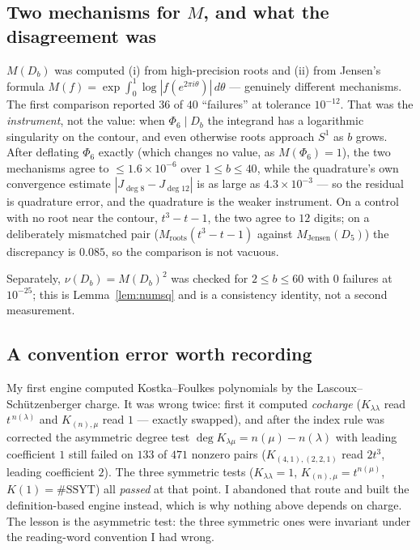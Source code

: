 \documentclass[11pt]{article}
\theoremstyle{definition}
\newcommand{\lam}{\lambda}
\newcommand{\Scirc}{S^1}
\begin{document}
\subsection{Two mechanisms for $M$, and what the disagreement was}

$M(D_b)$ was computed (i) from high-precision roots and (ii) from Jensen's formula
$M(f)=\exp\int_0^1\log|f(e^{2\pi i\theta})|\,d\theta$ --- genuinely different mechanisms. The
first comparison reported $36$ of $40$ ``failures'' at tolerance $10^{-12}$. That was the
\emph{instrument}, not the value: when $\Phi_6\mid D_b$ the integrand has a logarithmic
singularity on the contour, and even otherwise roots approach $\Scirc$ as $b$ grows. After
deflating $\Phi_6$ exactly (which changes no value, as $M(\Phi_6)=1$), the two mechanisms agree to
$\le1.6\times10^{-6}$ over $1\le b\le40$, while the quadrature's own convergence estimate
$|J_{\deg 8}-J_{\deg 12}|$ is as large as $4.3\times10^{-3}$ --- so the residual is quadrature
error, and the quadrature is the weaker instrument. On a control with no root near the contour,
$t^{3}-t-1$, the two agree to $12$ digits; on a deliberately mismatched pair
($M_{\text{roots}}(t^3-t-1)$ against $M_{\text{Jensen}}(D_5)$) the discrepancy is $0.085$, so the
comparison is not vacuous.

Separately, $\nu(D_b)=M(D_b)^{2}$ was checked for $2\le b\le60$ with $0$ failures at $10^{-25}$;
this is Lemma~\ref{lem:numsq} and is a consistency identity, not a second measurement.

\subsection{A convention error worth recording}

My first engine computed Kostka--Foulkes polynomials by the Lascoux--Schützenberger charge. It was
wrong twice: first it computed \emph{cocharge} ($K_{\lam\lam}$ read $t^{\,n(\lam)}$ and
$K_{(n),\mu}$ read $1$ --- exactly swapped), and after the index rule was corrected the asymmetric
degree test $\deg K_{\lam\mu}=n(\mu)-n(\lam)$ with leading coefficient $1$ still failed on $133$
of $471$ nonzero pairs ($K_{(4,1),(2,2,1)}$ read $2t^{3}$, leading coefficient $2$). The three
symmetric tests ($K_{\lam\lam}=1$, $K_{(n),\mu}=t^{n(\mu)}$, $K(1)=\#\mathrm{SSYT}$) all
\emph{passed} at that point. I abandoned that route and built the definition-based engine instead,
which is why nothing above depends on charge. The lesson is the asymmetric test: the three
symmetric ones were invariant under the reading-word convention I had wrong.
\end{document}
